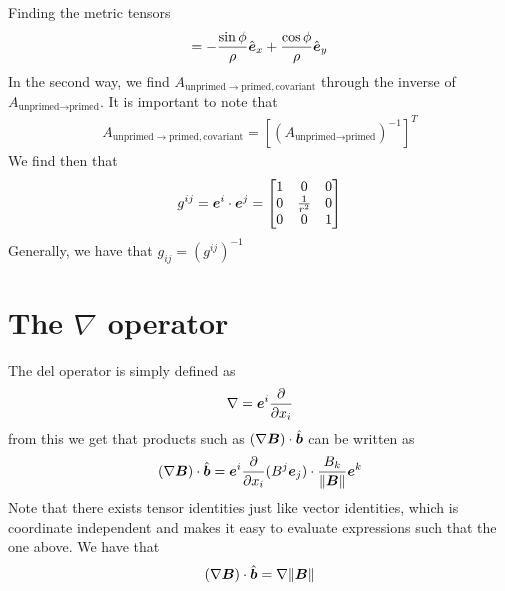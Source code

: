 \documentclass[a4paper, 12pt]{article}
\begin{document}
\begin{example}{Finding the metric tensors}
\begin{align*}
  =
  -\frac{\sin\phi}{\rho}\hat{\boldsymbol{e}}_x + \frac{\cos\phi}{\rho}\hat{\boldsymbol{e}}_y
 \end{align*}
 In the second way, we find $A_{\text{unprimed}\to \text{primed},
 \text{covariant}}$ through the inverse of $A_{\text{unprimed}\to
 \text{primed}}$. It is important to note that
 \begin{align*}
  A_{\text{unprimed}\to \text{primed}, \text{covariant}} =
  [(A_{\text{unprimed}\to \text{primed}})^{-1}]^T
 \end{align*}
 We find then that
 \begin{align*}
  g^{ij} = \boldsymbol{e}^i\cdot\boldsymbol{e}^j =
  \begin{bmatrix}
   1 & 0 & 0\\
   0 & \frac{1}{r^2} & 0\\
   0 & 0 & 1
  \end{bmatrix}
 \end{align*}
 Generally, we have that $g_{ij} = (g^{ij})^{-1}$
\end{example}
%



\section{The $\nabla$ operator}
The del operator is simply defined as
%
\begin{align*}
 \nabla = \boldsymbol{e}^i \frac{\partial {}}{\partial{x_i}}
\end{align*}
%
from this we get that products such as $(\nabla \boldsymbol{B}) \cdot \hat{\boldsymbol{b}}$ can be
written as
%
\begin{align*}
 (\nabla \boldsymbol{B}) \cdot \hat{\boldsymbol{b}} =
 \boldsymbol{e}^i \frac{\partial {}}{\partial{x_i}} (B^j \boldsymbol{e}_j) \cdot \frac{B_k}{\|\boldsymbol{B}\|}\boldsymbol{e}^k
\end{align*}
%
Note that there exists tensor identities just like vector identities, which is
coordinate independent and makes it easy to evaluate expressions such that the
one above. We have that
%
\begin{align*}
 (\nabla \boldsymbol{B}) \cdot \hat{\boldsymbol{b}} = \nabla \|\boldsymbol{B}\|
\end{align*}
\end{document}
